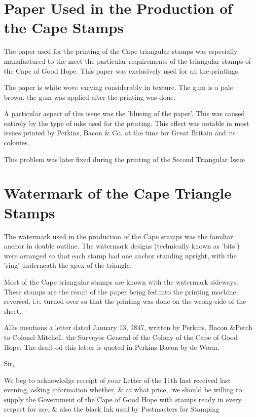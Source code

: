 \section{Paper Used in the Production of the Cape Stamps}

The paper used for the printing of the Cape triangular stamps was especially manufactured to the meet the particular requirements of the triangular stamps of the Cape of Good Hope. This paper was exclusively used for all the printings.

The paper is white wove varying considerably in texture. The gum is a pale brown. the gum was applied after the printing was done.

A particular aspect of this issue was the 'blueing of the paper'. This was caused entirely by the type of inks used for the printing. This effect was notable in most issues printed by Perkins, Bacon \& Co. at the time for Great Britain and its colonies.

This problem was later fixed during the printing of the Second Triangular Issue

\section{Watermark of the Cape Triangle Stamps}

The watermark used in the production of the Cape stamps was the familiar anchor in double outline. The watermark designs (technically known as 'bits') were arranged so that each stamp had one anchor standing upright, with the 'ring' underneath the apex of the triangle.

Most of the Cape triangular stamps are known with the watermark sideways. These stamps are the result of the paper being fed into the printing machine reversed, i.e. turned over so that the printing was done on the wrong side of the sheet.


Allis mentions a letter dated January 13, 1847, written by Perkins, Bacon \&Petch to Colonel Mitchell, the Surveyor General of the Colony of the Cape of Good Hope. The draft od this letter is quoted in Perkins Bacon by de Worm.

Sir,

We beg to acknowledge receipt of your Letter of the 11th Inst received last evening, asking information whether, \& at what price, `we should be willing to supply the Government of the Cape of Good Hope with stamps ready in every respect for use, \& also the black Ink used by Postmasters for Stamping 


